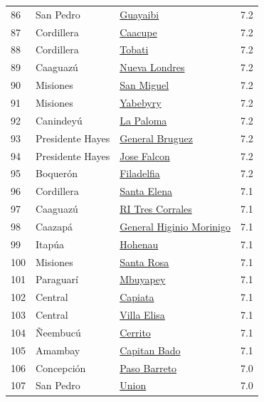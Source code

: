 {\begin{longtable}[]{@{}llll@{}}
86 & San Pedro & \hyperref[dist:02_San_Pedro:Guayaibi]{Guayaibi} & 7.2 \\
87 & Cordillera & \hyperref[dist:03_Cordillera:Caacupe]{Caacupe} & 7.2 \\
88 & Cordillera & \hyperref[dist:03_Cordillera:Tobati]{Tobati} & 7.2 \\
89 & Caaguazú & \hyperref[dist:05_Caaguazu:Nueva_Londres]{Nueva Londres} & 7.2 \\
90 & Misiones & \hyperref[dist:08_Misiones:San_Miguel]{San Miguel} & 7.2 \\
91 & Misiones & \hyperref[dist:08_Misiones:Yabebyry]{Yabebyry} & 7.2 \\
92 & Canindeyú & \hyperref[dist:14_Canindeyu:La_Paloma]{La Paloma} & 7.2 \\
93 & Presidente Hayes & \hyperref[dist:15_Presidente_Hayes:General_Bruguez]{General Bruguez} & 7.2 \\
94 & Presidente Hayes & \hyperref[dist:15_Presidente_Hayes:Jose_Falcon]{Jose Falcon} & 7.2 \\
95 & Boquerón & \hyperref[dist:16_Boqueron:Filadelfia]{Filadelfia} & 7.2 \\
96 & Cordillera & \hyperref[dist:03_Cordillera:Santa_Elena]{Santa Elena} & 7.1 \\
97 & Caaguazú & \hyperref[dist:05_Caaguazu:RI_Tres_Corrales]{RI Tres Corrales} & 7.1 \\
98 & Caazapá & \hyperref[dist:06_Caazapa:General_Higinio_Morinigo]{General Higinio Morinigo} & 7.1 \\
99 & Itapúa & \hyperref[dist:07_Itapua:Hohenau]{Hohenau} & 7.1 \\
100 & Misiones & \hyperref[dist:08_Misiones:Santa_Rosa]{Santa Rosa} & 7.1 \\
101 & Paraguarí & \hyperref[dist:09_Paraguari:Mbuyapey]{Mbuyapey} & 7.1 \\
102 & Central & \hyperref[dist:11_Central:Capiata]{Capiata} & 7.1 \\
103 & Central & \hyperref[dist:11_Central:Villa_Elisa]{Villa Elisa} & 7.1 \\
104 & Ñeembucú & \hyperref[dist:12_Neembucu:Cerrito]{Cerrito} & 7.1 \\
105 & Amambay & \hyperref[dist:13_Amambay:Capitan_Bado]{Capitan Bado} & 7.1 \\
106 & Concepción & \hyperref[dist:01_Concepción:Paso_Barreto]{Paso Barreto} & 7.0 \\
107 & San Pedro & \hyperref[dist:02_San_Pedro:Union]{Union} & 7.0 \\

\end{longtable}}
